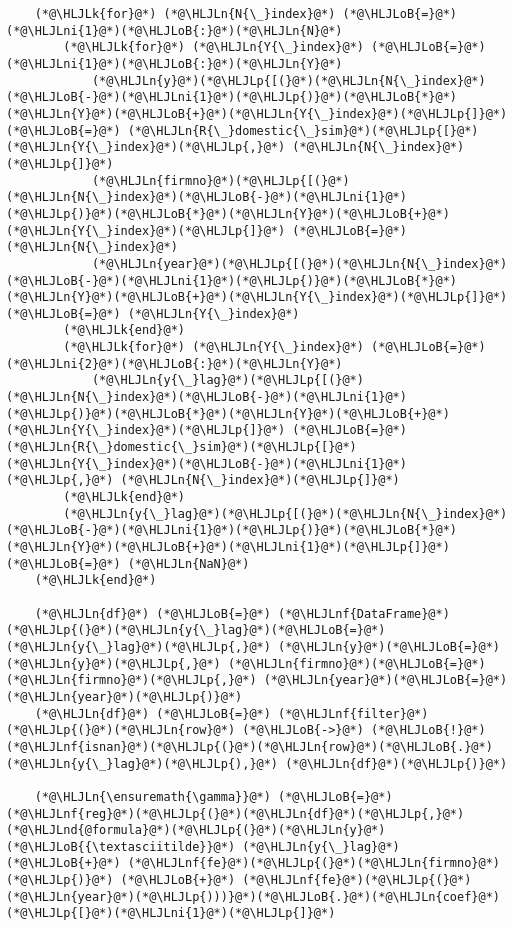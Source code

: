 \documentclass[12pt,a4paper]{article}
\newcommand{\HLJLk}[1]{\textcolor[RGB]{148,91,176}{\textbf{#1}}}
\newcommand{\HLJLn}[1]{#1}
\newcommand{\HLJLnd}[1]{\textcolor[RGB]{214,102,97}{#1}}
\newcommand{\HLJLnf}[1]{\textcolor[RGB]{66,102,213}{#1}}
\newcommand{\HLJLni}[1]{\textcolor[RGB]{59,151,46}{#1}}
\newcommand{\HLJLoB}[1]{\textcolor[RGB]{102,102,102}{\textbf{#1}}}
\newcommand{\HLJLp}[1]{#1}
\begin{document}
\begin{lstlisting}
    (*@\HLJLk{for}@*) (*@\HLJLn{N{\_}index}@*) (*@\HLJLoB{=}@*) (*@\HLJLni{1}@*)(*@\HLJLoB{:}@*)(*@\HLJLn{N}@*)
        (*@\HLJLk{for}@*) (*@\HLJLn{Y{\_}index}@*) (*@\HLJLoB{=}@*) (*@\HLJLni{1}@*)(*@\HLJLoB{:}@*)(*@\HLJLn{Y}@*)
            (*@\HLJLn{y}@*)(*@\HLJLp{[(}@*)(*@\HLJLn{N{\_}index}@*)(*@\HLJLoB{-}@*)(*@\HLJLni{1}@*)(*@\HLJLp{)}@*)(*@\HLJLoB{*}@*)(*@\HLJLn{Y}@*)(*@\HLJLoB{+}@*)(*@\HLJLn{Y{\_}index}@*)(*@\HLJLp{]}@*) (*@\HLJLoB{=}@*) (*@\HLJLn{R{\_}domestic{\_}sim}@*)(*@\HLJLp{[}@*)(*@\HLJLn{Y{\_}index}@*)(*@\HLJLp{,}@*) (*@\HLJLn{N{\_}index}@*)(*@\HLJLp{]}@*)
            (*@\HLJLn{firmno}@*)(*@\HLJLp{[(}@*)(*@\HLJLn{N{\_}index}@*)(*@\HLJLoB{-}@*)(*@\HLJLni{1}@*)(*@\HLJLp{)}@*)(*@\HLJLoB{*}@*)(*@\HLJLn{Y}@*)(*@\HLJLoB{+}@*)(*@\HLJLn{Y{\_}index}@*)(*@\HLJLp{]}@*) (*@\HLJLoB{=}@*) (*@\HLJLn{N{\_}index}@*)
            (*@\HLJLn{year}@*)(*@\HLJLp{[(}@*)(*@\HLJLn{N{\_}index}@*)(*@\HLJLoB{-}@*)(*@\HLJLni{1}@*)(*@\HLJLp{)}@*)(*@\HLJLoB{*}@*)(*@\HLJLn{Y}@*)(*@\HLJLoB{+}@*)(*@\HLJLn{Y{\_}index}@*)(*@\HLJLp{]}@*) (*@\HLJLoB{=}@*) (*@\HLJLn{Y{\_}index}@*)
        (*@\HLJLk{end}@*)
        (*@\HLJLk{for}@*) (*@\HLJLn{Y{\_}index}@*) (*@\HLJLoB{=}@*) (*@\HLJLni{2}@*)(*@\HLJLoB{:}@*)(*@\HLJLn{Y}@*)
            (*@\HLJLn{y{\_}lag}@*)(*@\HLJLp{[(}@*)(*@\HLJLn{N{\_}index}@*)(*@\HLJLoB{-}@*)(*@\HLJLni{1}@*)(*@\HLJLp{)}@*)(*@\HLJLoB{*}@*)(*@\HLJLn{Y}@*)(*@\HLJLoB{+}@*)(*@\HLJLn{Y{\_}index}@*)(*@\HLJLp{]}@*) (*@\HLJLoB{=}@*) (*@\HLJLn{R{\_}domestic{\_}sim}@*)(*@\HLJLp{[}@*)(*@\HLJLn{Y{\_}index}@*)(*@\HLJLoB{-}@*)(*@\HLJLni{1}@*)(*@\HLJLp{,}@*) (*@\HLJLn{N{\_}index}@*)(*@\HLJLp{]}@*)
        (*@\HLJLk{end}@*)
        (*@\HLJLn{y{\_}lag}@*)(*@\HLJLp{[(}@*)(*@\HLJLn{N{\_}index}@*)(*@\HLJLoB{-}@*)(*@\HLJLni{1}@*)(*@\HLJLp{)}@*)(*@\HLJLoB{*}@*)(*@\HLJLn{Y}@*)(*@\HLJLoB{+}@*)(*@\HLJLni{1}@*)(*@\HLJLp{]}@*) (*@\HLJLoB{=}@*) (*@\HLJLn{NaN}@*)
    (*@\HLJLk{end}@*)

    (*@\HLJLn{df}@*) (*@\HLJLoB{=}@*) (*@\HLJLnf{DataFrame}@*)(*@\HLJLp{(}@*)(*@\HLJLn{y{\_}lag}@*)(*@\HLJLoB{=}@*)(*@\HLJLn{y{\_}lag}@*)(*@\HLJLp{,}@*) (*@\HLJLn{y}@*)(*@\HLJLoB{=}@*)(*@\HLJLn{y}@*)(*@\HLJLp{,}@*) (*@\HLJLn{firmno}@*)(*@\HLJLoB{=}@*)(*@\HLJLn{firmno}@*)(*@\HLJLp{,}@*) (*@\HLJLn{year}@*)(*@\HLJLoB{=}@*)(*@\HLJLn{year}@*)(*@\HLJLp{)}@*)
    (*@\HLJLn{df}@*) (*@\HLJLoB{=}@*) (*@\HLJLnf{filter}@*)(*@\HLJLp{(}@*)(*@\HLJLn{row}@*) (*@\HLJLoB{->}@*) (*@\HLJLoB{!}@*)(*@\HLJLnf{isnan}@*)(*@\HLJLp{(}@*)(*@\HLJLn{row}@*)(*@\HLJLoB{.}@*)(*@\HLJLn{y{\_}lag}@*)(*@\HLJLp{),}@*) (*@\HLJLn{df}@*)(*@\HLJLp{)}@*)

    (*@\HLJLn{\ensuremath{\gamma}}@*) (*@\HLJLoB{=}@*) (*@\HLJLnf{reg}@*)(*@\HLJLp{(}@*)(*@\HLJLn{df}@*)(*@\HLJLp{,}@*) (*@\HLJLnd{@formula}@*)(*@\HLJLp{(}@*)(*@\HLJLn{y}@*) (*@\HLJLoB{{\textasciitilde}}@*) (*@\HLJLn{y{\_}lag}@*) (*@\HLJLoB{+}@*) (*@\HLJLnf{fe}@*)(*@\HLJLp{(}@*)(*@\HLJLn{firmno}@*)(*@\HLJLp{)}@*) (*@\HLJLoB{+}@*) (*@\HLJLnf{fe}@*)(*@\HLJLp{(}@*)(*@\HLJLn{year}@*)(*@\HLJLp{)))}@*)(*@\HLJLoB{.}@*)(*@\HLJLn{coef}@*)(*@\HLJLp{[}@*)(*@\HLJLni{1}@*)(*@\HLJLp{]}@*)


\end{lstlisting}
\end{document}
